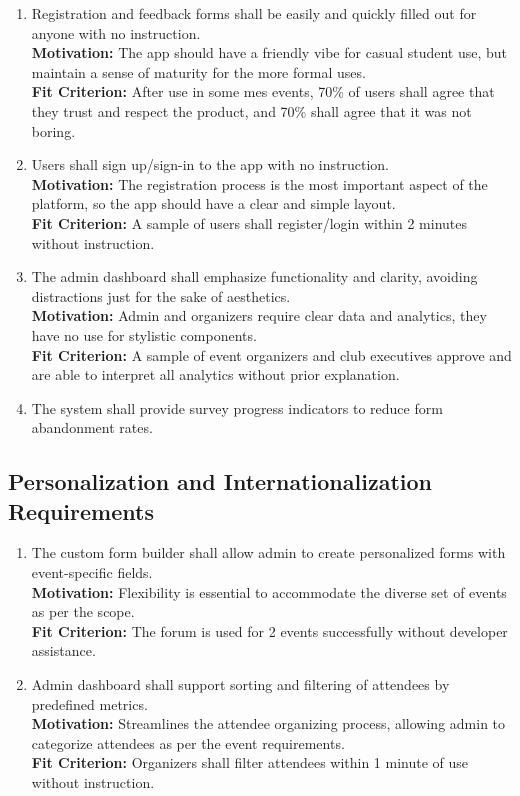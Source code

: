 \documentclass[12pt]{article}
\begin{document}
\begin{enumerate}[label=UHR-EoU.\arabic*, wide=0pt, leftmargin=*]
  \item Registration and feedback forms shall be easily and quickly filled out for anyone with no instruction.\\[2mm]
    {\bf Motivation:} The app should have a friendly vibe for casual student use, but maintain a sense of maturity for the more formal uses.\\
    {\bf Fit Criterion:} After use in some \gls{mes} events, 70\% of users shall agree that they trust and respect the product, and 70\% shall agree that it was not boring.
  \item Users shall sign up/sign-in to the app with no instruction. \\[2mm]
    {\bf Motivation:} The registration process is the most important aspect of the platform, so the app should have a clear and simple layout.\\
    {\bf Fit Criterion:} A sample of users shall register/login within 2 minutes without instruction.
  \item The admin dashboard shall emphasize functionality and clarity, avoiding distractions just for the sake of aesthetics.\\[2mm]
    {\bf Motivation:} Admin and organizers require clear data and analytics, they have no use for stylistic components.\\
    {\bf Fit Criterion:} A sample of event organizers and club executives approve and are able to interpret all analytics without prior explanation.
  \item The system shall provide survey progress indicators to reduce form abandonment
    rates.
\end{enumerate}

\subsection{Personalization and Internationalization Requirements}
\begin{enumerate}[label=UHR-PIR.\arabic*, wide=0pt, leftmargin=*]
  \item The custom form builder shall allow admin to create personalized forms with event-specific fields.\\[2mm]
    {\bf Motivation:} Flexibility is essential to accommodate the diverse set of events as per the scope.\\
    {\bf Fit Criterion:} The forum is used for 2 events successfully without developer assistance.
  \item Admin dashboard shall support sorting and filtering of attendees by predefined metrics.\\[2mm]
    {\bf Motivation:} Streamlines the attendee organizing process, allowing admin to categorize attendees as per the event requirements.\\
    {\bf Fit Criterion:} Organizers shall filter attendees within 1 minute of use without instruction.
\end{enumerate}
\end{document}
